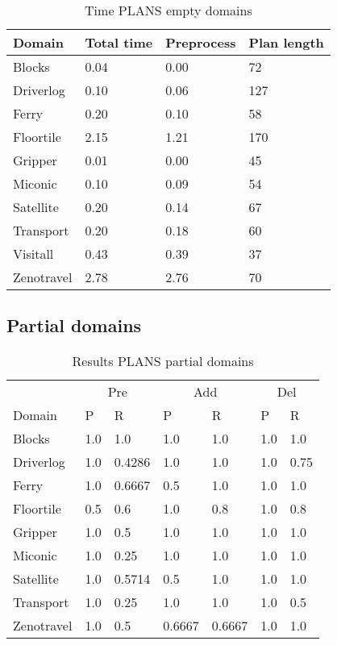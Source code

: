 \documentclass[]{article}
\begin{document}
\begin{table}[H]
	\caption{Time PLANS empty domains}
	\label{tab:time_plans_empty}
	\begin{center}
		\begin{tabular}{l|l|l|l|}			 
			Domain & Total time & Preprocess & Plan length  \\
			\hline
			Blocks & 0.04 & 0.00 & 72 \\
			Driverlog & 0.10 & 0.06 & 127 \\
			Ferry & 0.20 & 0.10 & 58 \\
			Floortile & 2.15 & 1.21 & 170 \\
			Gripper & 0.01 & 0.00 & 45 \\
			Miconic & 0.10 & 0.09 & 54 \\
			Satellite & 0.20 & 0.14 & 67 \\
			Transport & 0.20 & 0.18 & 60 \\
			Visitall & 0.43 & 0.39 & 37 \\
			Zenotravel & 2.78 & 2.76 & 70 \\
		\end{tabular}
	\end{center}	
\end{table}

\subsection{Partial domains}

\begin{table}[H]
	\caption{Results PLANS partial domains}
	\label{tab:results_plans_partial}
	\begin{center}
		\begin{tabular}{l|l|l|l|l|l|l|}
			& \multicolumn{2}{|c|}{Pre} & \multicolumn{2}{|c|}{Add} & \multicolumn{2}{|c|}{Del}  \\ \cline{2-7}			 
			Domain & P & R & P & R & P & R \\
			\hline
			Blocks & 1.0 & 1.0 & 1.0 & 1.0 & 1.0 & 1.0 \\
			Driverlog & 1.0 & 0.4286 & 1.0 & 1.0 & 1.0 & 0.75 \\
			Ferry & 1.0 & 0.6667 & 0.5 & 1.0 & 1.0 & 1.0 \\
			Floortile & 0.5 & 0.6 & 1.0 & 0.8 & 1.0 & 0.8 \\
			Gripper & 1.0 & 0.5 & 1.0 & 1.0 & 1.0 & 1.0 \\
			Miconic & 1.0 & 0.25 & 1.0 & 1.0 & 1.0 & 1.0 \\
			Satellite & 1.0 & 0.5714 & 0.5 & 1.0 & 1.0 & 1.0 \\
			Transport & 1.0 & 0.25 & 1.0 & 1.0 & 1.0 & 0.5 \\
			Zenotravel & 1.0 & 0.5 & 0.6667 & 0.6667 & 1.0 & 1.0 \\
		\end{tabular}
	\end{center}	
\end{table}
\end{document}
